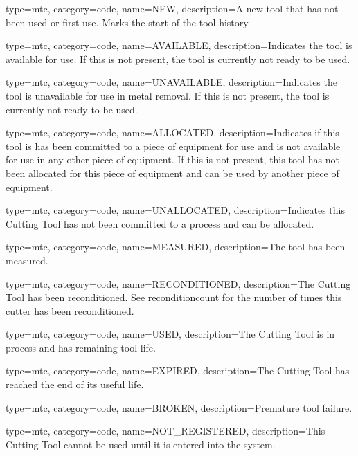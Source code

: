 {
  type=mtc,
  category=code,
  name={NEW},
  description={A new tool that has not been used or first use. Marks the start of the tool history.}
}


{
  type=mtc,
  category=code,
  name={AVAILABLE},
  description={Indicates the tool is available for use. If this is not present, the tool is currently not ready to be used.}
}


{
  type=mtc,
  category=code,
  name={UNAVAILABLE},
  description={Indicates the tool is unavailable for use in metal removal. If this is not present, the tool is currently not ready to be used.}
}


{
  type=mtc,
  category=code,
  name={ALLOCATED},
  description={Indicates if this tool is has been committed to a piece of equipment for use and is not available for use in any other piece of equipment. If this is not present, this tool has not been allocated for this piece of equipment and can be used by another piece of equipment.}
}


{
  type=mtc,
  category=code,
  name={UNALLOCATED},
  description={Indicates this Cutting Tool has not been committed to a process and can be allocated.}
}


{
  type=mtc,
  category=code,
  name={MEASURED},
  description={The tool has been measured.}
}


{
  type=mtc,
  category=code,
  name={RECONDITIONED},
  description={The Cutting Tool has been reconditioned. See \gls{reconditioncount} for the number of times this cutter has been reconditioned.}
}


{
  type=mtc,
  category=code,
  name={USED},
  description={The Cutting Tool is in process and has remaining tool life.}
}


{
  type=mtc,
  category=code,
  name={EXPIRED},
  description={The Cutting Tool has reached the end of its useful life.}
}


{
  type=mtc,
  category=code,
  name={BROKEN},
  description={Premature tool failure.}
}


{
  type=mtc,
  category=code,
  name={NOT\_REGISTERED},
  description={This Cutting Tool cannot be used until it is entered into the system.}
}


